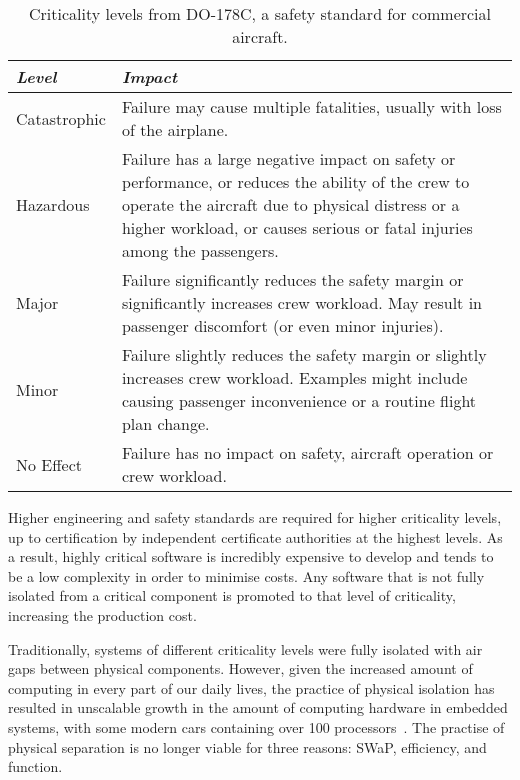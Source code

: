 \begin{table}
     \centering
     \begin{tabular}{ l p{10cm}} \toprule
         \emph{Level}   & \emph{Impact} \\ \midrule
         Catastrophic   & Failure may cause multiple fatalities, usually with loss of the airplane. \\
         Hazardous      & Failure has a large negative impact on safety or performance, or reduces the
                          ability of the crew to operate the aircraft due to physical distress or 
                          a higher workload, or causes serious or fatal injuries among the passengers.\\
         Major          & Failure significantly reduces the safety margin or significantly increases
                          crew workload. May result in passenger discomfort (or even minor
                          injuries).\\
         Minor          & Failure slightly reduces the safety margin or slightly increases crew
                          workload. Examples might include causing passenger inconvenience or a
                          routine flight plan change. \\
         No Effect      & Failure has no impact on safety, aircraft operation or crew workload. \\
         \bottomrule
     \end{tabular}
     \caption{Criticality levels from DO-178C, a safety standard for commercial aircraft.}
     \label{tab:critable}
 \end{table}

Higher engineering and safety standards are required for higher criticality levels, up to
certification by independent certificate authorities at the highest levels. As a result, highly
critical software is incredibly expensive to develop and tends to be a low complexity in order to
minimise costs. Any software that is not fully isolated from a critical component is promoted to
that level of criticality, increasing the production cost.

Traditionally, systems of different criticality levels were fully isolated with
air gaps between physical components. However, given the increased amount of
computing in every part of our daily lives, the practice of physical isolation
has resulted in unscalable growth in the amount of computing hardware in
embedded systems, with some modern cars containing over 100
processors~\citep{Hergenhan_Heiser_08}. The practise of physical separation is no 
longer viable for three reasons: \gls{SWaP}, efficiency, and function.

